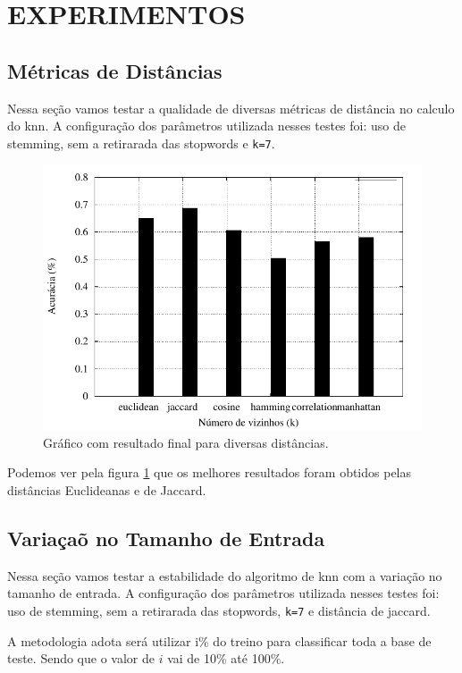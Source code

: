 \documentclass[a4paper, 11 pt, onecolumn]{article}   %
\begin{document}
\pagebreak

\section{EXPERIMENTOS}
\label{sec:exp}

\subsection{Métricas de Distâncias}
Nessa seção vamos testar a qualidade de diversas métricas de distância no calculo do knn.
A configuração dos parâmetros utilizada nesses testes foi: uso de stemming, sem a retirarada das stopwords e \texttt{k=7}.

\begin{figure}
 \includegraphics{imagens/distance.pdf}
 \caption{\label{fig:distance} Gráfico com resultado final para diversas distâncias.}
\end{figure}

Podemos ver pela figura \ref{fig:distance} que os melhores resultados foram obtidos pelas distâncias Euclideanas e de Jaccard.

\pagebreak

\subsection{Variaçaõ no Tamanho de Entrada}
Nessa seção vamos testar a estabilidade do algoritmo de knn com a variação no tamanho de entrada.
A configuração dos parâmetros utilizada nesses testes foi: uso de stemming, sem a retirarada das stopwords, \texttt{k=7} e distância de jaccard.

A metodologia adota será utilizar i\% do treino para classificar toda a base de teste. Sendo que o valor de $i$ vai de 10\% até 100\%.
\end{document}
